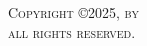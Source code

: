 \newpage
\thispagestyle{empty}
\addtocounter{page}{-1}

\vspace*{\fill}
\scshape \noindent Copyright \copyright 2025, by \authorname \\
\noindent all rights reserved.
\vspace*{\fill}
\newpage
\rm
